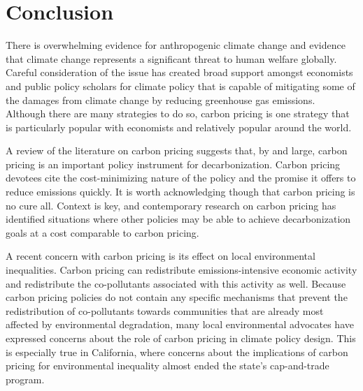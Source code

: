 \newpage
\section*{Conclusion}

There is overwhelming evidence for anthropogenic climate change and evidence that climate change represents a significant threat to human welfare globally. Careful consideration of the issue has created broad support amongst economists and public policy scholars for climate policy that is capable of mitigating some of the damages from climate change by reducing greenhouse gas emissions. Although there are many strategies to do so, carbon pricing is one strategy that is particularly popular with economists and relatively popular around the world. 

A review of the literature on carbon pricing suggests that, by and large, carbon pricing is an important policy instrument for decarbonization. Carbon pricing devotees cite the cost-minimizing nature of the policy and the promise it offers to reduce emissions quickly. It is worth acknowledging though that carbon pricing is no cure all. Context is key, and contemporary research on carbon pricing has identified situations where other policies may be able to achieve decarbonization goals at a cost comparable to carbon pricing. 

A recent concern with carbon pricing is its effect on local environmental inequalities. Carbon pricing can redistribute emissions-intensive economic activity and redistribute the co-pollutants associated with this activity as well. Because carbon pricing policies do not contain any specific mechanisms that prevent the redistribution of co-pollutants towards communities that are already most affected by environmental degradation, many local environmental advocates have expressed concerns about the role of carbon pricing in climate policy design. This is especially true in California, where concerns about the implications of carbon pricing for environmental inequality almost ended the state's cap-and-trade program. 

